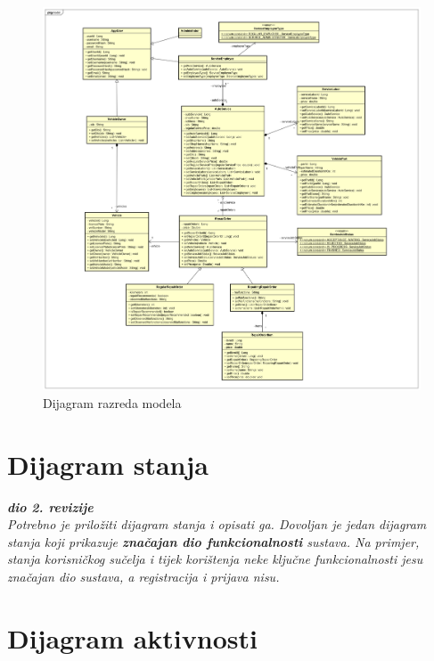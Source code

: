 			
		\begin{figure}[h]
			\centering
			\includegraphics[width=1.0\linewidth]{dijagrami/class_diagram}
			\caption{Dijagram razreda modela}
			\label{fig:classdiagram}
		\end{figure}
			
			
			\eject
		
		\section{Dijagram stanja}
			
			
			\textbf{\textit{dio 2. revizije}}\\
			
			\textit{Potrebno je priložiti dijagram stanja i opisati ga. Dovoljan je jedan dijagram stanja koji prikazuje \textbf{značajan dio funkcionalnosti} sustava. Na primjer, stanja korisničkog sučelja i tijek korištenja neke ključne funkcionalnosti jesu značajan dio sustava, a registracija i prijava nisu. }
			
			
			\eject 
		
		\section{Dijagram aktivnosti}
			
